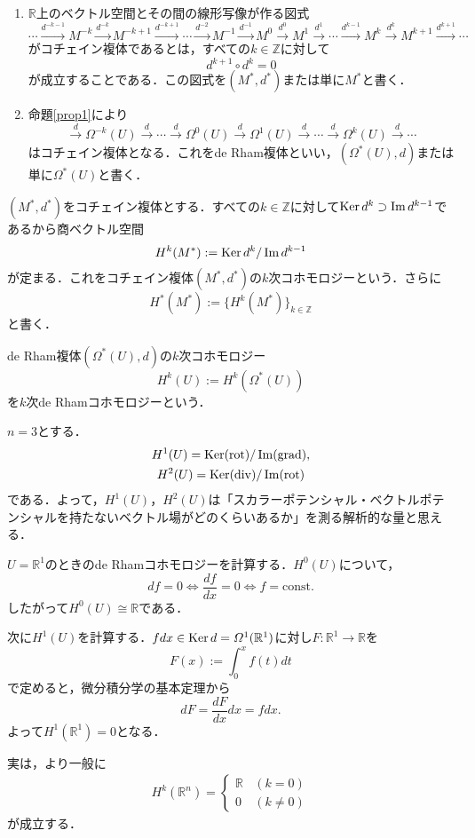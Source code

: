 \documentclass[uplatex]{jsarticle}
\begin{document}
\begin{definition}
\begin{enumerate}[label=(\arabic*)]
\item $\mathbb{R}$上のベクトル空間とその間の線形写像が作る図式
\[ \cdots \stackrel{d^{-k-1}}{\to}M^{-k}\stackrel{d^{-k}}{\to}M^{-k+1}\stackrel{d^{-k+1}}{\to}\cdots\stackrel{d^{-2}}{\to}M^{-1}\stackrel{d^{-1}}{\to}M^0\stackrel{d^0}{\to}M^1\stackrel{d^1}{\to}\cdots \stackrel{d^{k-1}}{\to}M^k\stackrel{d^k}{\to}M^{k+1}\stackrel{d^{k+1}}{\to} \cdots \]
がコチェイン複体であるとは，すべての$k\in\mathbb{Z}$に対して
\[ d^{k+1}\circ d^k=0 \]
が成立することである．この図式を$(M^*,d^*)$または単に$M^*$と書く．
\item 命題\ref{prop1}により
\[ \stackrel{d}{\to}\Omega^{-k}(U)\stackrel{d}{\to}\cdots\stackrel{d}{\to}\Omega^0(U)\stackrel{d}{\to}\Omega^1(U)\stackrel{d}{\to}\cdots\stackrel{d}{\to}\Omega^k(U)\stackrel{d}{\to}\cdots \]
はコチェイン複体となる．これをde Rham複体といい，$(\Omega^*(U),d)$または単に$\Omega^*(U)$と書く．
\end{enumerate}
\end{definition}
\begin{definition}
$(M^*,d^*)$をコチェイン複体とする．すべての$k\in \mathbb{Z}$に対して$\operatorname{Ker} d^k\supset\operatorname{Im} d^{k-1}$であるから商ベクトル空間
\[ H^k(M^*):=\operatorname{Ker} d^k/\operatorname{Im} d^{k-1} \]
が定まる．これをコチェイン複体$(M^*,d^*)$の$k$次コホモロジーという．さらに
\[ H^*(M^*):=\{H^k(M^*)\}_{k\in\mathbb{Z}} \]
と書く．
\end{definition}
\begin{definition}
de Rham複体$(\Omega^*(U),d)$の$k$次コホモロジー
\[ H^k(U):=H^k(\Omega^*(U)) \]
を$k$次de Rhamコホモロジーという．
\end{definition}
\begin{example}
$n=3$とする．
\begin{gather*}
 H^1(U)=\operatorname{Ker} (\operatorname{rot})/\operatorname{Im} (\operatorname{grad}), \\
 H^2(U)=\operatorname{Ker} (\operatorname{div})/\operatorname{Im} (\operatorname{rot})
\end{gather*}
である．よって，$H^1(U)$，$H^2(U)$は「スカラーポテンシャル・ベクトルポテンシャルを持たないベクトル場がどのくらいあるか」を測る解析的な量と思える．
\end{example}
\begin{example}
$U=\mathbb{R}^1$のときのde Rhamコホモロジーを計算する．$H^0(U)$について，
\[ df=0 \Leftrightarrow \frac{df}{dx}=0 \Leftrightarrow f=\mathrm{const} .\]
したがって$H^0(U)\cong \mathbb{R}$である．

次に$H^1(U)$を計算する．$fdx\in \operatorname{Ker} d=\varOmega^1(\mathbb{R}^1)$に対し$F\colon \mathbb{R}^1\to\mathbb{R}$を
\[ F(x):=\int^x_0 f(t)dt \]
で定めると，微分積分学の基本定理から
\[ dF=\frac{dF}{dx}dx=fdx. \]
よって$H^1(\mathbb{R}^1)=0$となる．

実は，より一般に
\begin{eqnarray*}
  H^k(\mathbb{R}^n)=
  \begin{cases}
    \mathbb{R} & (k=0) \\
    0\ & (k\neq 0)
  \end{cases}
\end{eqnarray*}
が成立する．
\end{example}
\end{document}
